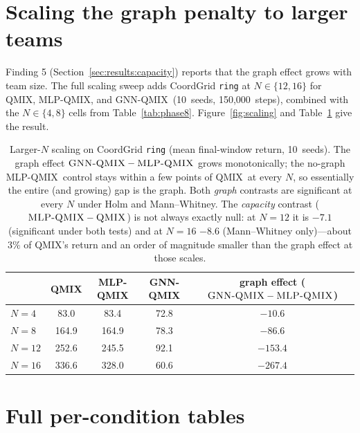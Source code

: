 \documentclass[10pt]{article}
\newcommand{\algoname}[1]{\textsc{#1}}
\newcommand{\qmix}{\algoname{QMIX}}
\newcommand{\gnnqmix}{\algoname{GNN-QMIX}}
\newcommand{\mlpqmix}{\algoname{MLP-QMIX}}
\newcommand{\PEsteps}{150{,}000}      %
\newcommand{\PEseeds}{10}             %
\newcommand{\PSgapNfour}{-10.6}       %
\newcommand{\PSgapNeight}{-86.6}      %
\newcommand{\PSgapNtwelve}{-153.4}    %
\newcommand{\PSgapNsixteen}{-267.4}   %
\newcommand{\PSgnnNsixteen}{60.6}     %
\begin{document}
\section{Scaling the graph penalty to larger teams}
\label{app:scaling}

Finding 5 (Section~\ref{sec:results:capacity}) reports that the graph
effect grows with team size. The full scaling sweep adds CoordGrid
\texttt{ring} at $N\in\{12,16\}$ for \qmix, \mlpqmix, and \gnnqmix\
(\PEseeds\ seeds, \PEsteps\ steps), combined with the $N\in\{4,8\}$ cells
from Table~\ref{tab:phase8}. Figure~\ref{fig:scaling} and
Table~\ref{tab:scaling} give the result.


\begin{table}[!ht]
  \centering
  \small
  \caption{Larger-$N$ scaling on CoordGrid \texttt{ring} (mean final-window
  return, \PEseeds\ seeds). The graph effect $\gnnqmix-\mlpqmix$ grows
  monotonically; the no-graph \mlpqmix\ control stays within a few points of
  \qmix\ at every $N$, so essentially the entire (and growing) gap is the
  graph. Both \emph{graph} contrasts are significant at every $N$ under Holm
  and Mann--Whitney. The \emph{capacity} contrast ($\mlpqmix-\qmix$) is not
  always exactly null: at $N{=}12$ it is $-7.1$ (significant under both
  tests) and at $N{=}16$ $-8.6$ (Mann--Whitney only)---about $3\%$ of
  \qmix's return and an order of magnitude smaller than the graph effect at
  those scales.}
  \label{tab:scaling}
  \begin{tabular}{lcccc}
    \toprule
    & \qmix & \mlpqmix & \gnnqmix & graph effect ($\gnnqmix-\mlpqmix$) \\
    \midrule
    $N=4$  & 83.0 & 83.4 & 72.8 & $\PSgapNfour$ \\
    $N=8$  & 164.9 & 164.9 & 78.3 & $\PSgapNeight$ \\
    $N=12$ & 252.6 & 245.5 & 92.1 & $\PSgapNtwelve$ \\
    $N=16$ & 336.6 & 328.0 & \PSgnnNsixteen & $\PSgapNsixteen$ \\
    \bottomrule
  \end{tabular}
\end{table}

\section{Full per-condition tables}
\label{app:fulltables}
\end{document}

